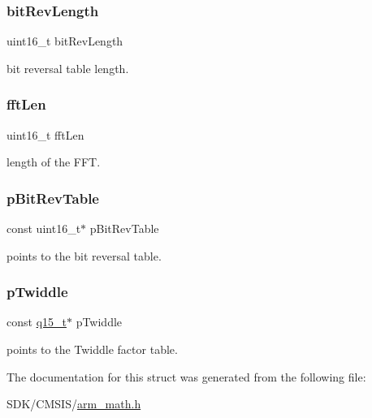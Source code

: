 \subsubsection{\texorpdfstring{bit\+Rev\+Length}{bitRevLength}}
{\footnotesize\ttfamily uint16\+\_\+t bit\+Rev\+Length}

bit reversal table length. \mbox{\label{structarm__cfft__instance__q15_ab8db3bbe7c61e6bb8ca2a55e3446e11a}} 
\subsubsection{\texorpdfstring{fft\+Len}{fftLen}}
{\footnotesize\ttfamily uint16\+\_\+t fft\+Len}

length of the F\+FT. \mbox{\label{structarm__cfft__instance__q15_a3b229432d381b0a511a9cdbe3aa74e78}} 
\subsubsection{\texorpdfstring{p\+Bit\+Rev\+Table}{pBitRevTable}}
{\footnotesize\ttfamily const uint16\+\_\+t$\ast$ p\+Bit\+Rev\+Table}

points to the bit reversal table. \mbox{\label{structarm__cfft__instance__q15_a7f19217cfa0370f9e518caa882265386}} 
\subsubsection{\texorpdfstring{p\+Twiddle}{pTwiddle}}
{\footnotesize\ttfamily const \mbox{\hyperlink{arm__math_8h_ab5a8fb21a5b3b983d5f54f31614052ea}{q15\+\_\+t}}$\ast$ p\+Twiddle}

points to the Twiddle factor table. 

The documentation for this struct was generated from the following file\+:\begin{DoxyCompactItemize}
\item 
S\+D\+K/\+C\+M\+S\+I\+S/\mbox{\hyperlink{arm__math_8h}{arm\+\_\+math.\+h}}\end{DoxyCompactItemize}
